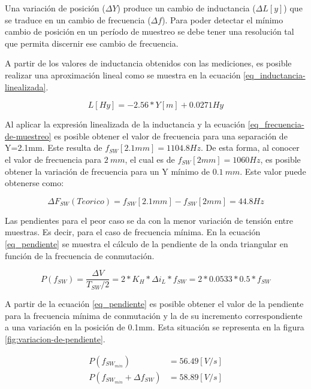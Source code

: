 \noindent Una variación de posición ($\Delta Y$) produce un cambio de inductancia ($\Delta L[y]$) que se traduce en un cambio de frecuencia ($\Delta f$). Para poder detectar el mínimo cambio de posición en un período de muestreo se debe tener una resolución tal que permita discernir ese cambio de frecuencia.

\noindent A partir de los valores de inductancia  obtenidos con las mediciones, es posible realizar una aproximación lineal como se muestra en la ecuación \ref{eq_inductancia-linealizada}.

\begin{equation} \label{eq_inductancia-linealizada}
	L[Hy] = -2.56 * Y[m] + 0.0271 Hy
\end{equation}

\noindent Al aplicar la expresión linealizada de la inductancia y la ecuación \ref{eq_frecuencia-de-muestreo} es posible obtener el valor de frecuencia para una separación de Y=2.1mm. Este resulta de $f_{SW}[2.1mm] = 1104.8 Hz$. De esta forma, al conocer el valor de frecuencia para $2\:mm$, el cual es de $f_{SW}[2mm] = 1060 Hz$, es posible obtener la variación de frecuencia para un Y mínimo de $0.1\:mm$. Este valor puede obtenerse como:

\begin{equation} 
	\Delta F_{SW}(Teorico) = f_{SW}[2.1mm] - f_{SW}[2mm] = 44.8 Hz
\end{equation}

\noindent Las pendientes para el peor caso se da con la menor variación de tensión entre muestras. Es decir, para el caso de frecuencia mínima. En la ecuación \ref{eq_pendiente} se muestra el cálculo de la pendiente de la onda triangular en función de la frecuencia de conmutación.

\begin{equation} \label{eq_pendiente}
	P(f_{SW}) = \frac{\Delta V}{T_{SW}/2} = 2*K_H*\Delta i_L*f_{SW} = 2 * 0.0533 * 0.5 * f_{SW}
\end{equation}

\noindent A partir de la ecuación \ref{eq_pendiente} es posible obtener el valor de la pendiente para la frecuencia mínima de conmutación y la de su incremento correspondiente a una variación en la posición de 0.1mm. Esta situación se representa en la figura \ref{fig:variacion-de-pendiente}.

\begin{equation} 
	\begin{aligned}
		P(f_{SW_{min}}) &= 56.49 [V/s] \\
		P(f_{SW_{min}} + \Delta f_{SW}) &= 58.89 [V/s] \\
	\end{aligned}
\end{equation}


